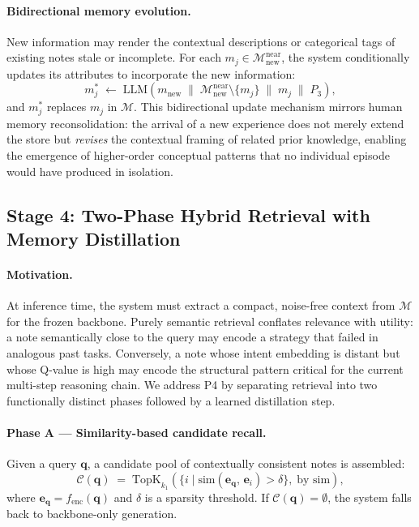 \documentclass{article}
\newcommand{\memset}{\mathcal{M}}
\newcommand{\note}{m}
\begin{document}
\paragraph{Bidirectional memory evolution.}
New information may render the contextual descriptions or categorical tags of
existing notes stale or incomplete.
For each $\note_j \in \memset_{\mathrm{new}}^{\mathrm{near}}$, the system
conditionally updates its attributes to incorporate the new information:
\begin{equation}
  \note_j^*
  \;\leftarrow\;
  \mathrm{LLM}\!\left(
    \note_{\mathrm{new}} \;\|\;
    \memset_{\mathrm{new}}^{\mathrm{near}} \setminus \{\note_j\} \;\|\;
    \note_j \;\|\; P_3
  \right),
  \label{eq:memory_evolution}
\end{equation}
and $\note_j^*$ replaces $\note_j$ in $\memset$.
This bidirectional update mechanism mirrors human memory reconsolidation: the
arrival of a new experience does not merely extend the store but
\emph{revises} the contextual framing of related prior knowledge, enabling the
emergence of higher-order conceptual patterns that no individual episode would
have produced in isolation.

\subsection{Stage 4: Two-Phase Hybrid Retrieval with Memory Distillation}
\label{sec:stage4}

\paragraph{Motivation.}
At inference time, the system must extract a compact, noise-free context from
$\memset$ for the frozen backbone.
Purely semantic retrieval conflates relevance with utility: a note
semantically close to the query may encode a strategy that failed in
analogous past tasks.
Conversely, a note whose intent embedding is distant but whose Q-value is
high may encode the structural pattern critical for the current multi-step
reasoning chain.
We address P4 by separating retrieval into two functionally distinct phases
followed by a learned distillation step.

\paragraph{Phase A --- Similarity-based candidate recall.}
Given a query $\mathbf{q}$, a candidate pool of contextually consistent notes
is assembled:
\begin{equation}
  \mathcal{C}(\mathbf{q})
  \;=\;
  \mathrm{TopK}_{k_1}\!\left(
    \bigl\{i \mid \mathrm{sim}(\mathbf{e}_\mathbf{q},\, \mathbf{e}_i) > \delta\bigr\},\;
    \text{by sim}
  \right),
  \label{eq:phase_a}
\end{equation}
where $\mathbf{e}_\mathbf{q} = f_{\mathrm{enc}}(\mathbf{q})$ and $\delta$ is
a sparsity threshold.
If $\mathcal{C}(\mathbf{q}) = \emptyset$, the system falls back to
backbone-only generation.
\end{document}
